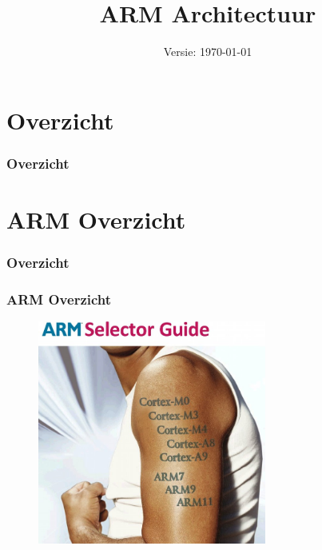 \documentclass{beamer}
\title[]{ARM Architectuur}
\subtitle{}
\author{}
\institute{Jeroen Doggen \\ jeroen.doggen@ap.be}
\date{Versie: \today}
\begin{document}
\maketitle

\section*{Overzicht}
\begin{frame}
\frametitle{Overzicht}
\tableofcontents[pausesections]
\end{frame}


\section{ARM Overzicht}
\begin{frame}
\frametitle{Overzicht}
\tableofcontents[sectionstyle=show/shaded,subsectionstyle=show/shaded] 
\end{frame}

\begin{frame} 
\frametitle{ARM Overzicht}
\begin{figure}[h] \begin{center}
\includegraphics[width=0.67\textwidth]{figures/armarm.jpeg}
\end{center} \end{figure}
\end{frame}
\end{document}
